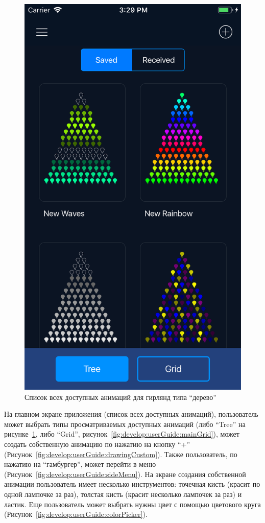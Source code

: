 \begin{figure}[H]
\centering
	\includegraphics[scale=0.2]{figures/userGuide/mainTree.png}
	\caption{Список всех доступных анимаций для гирлянд типа ``дерево''}
	\label{fig:develop:userGuide:mainTree}
\end{figure}

На главном экране приложения (список всех доступных анимаций), пользователь может выбрать типы просматриваемых доступных анимаций (либо ``Tree'' на рисунке~\ref{fig:develop:userGuide:mainTree}, либо ``Grid'', рисунок~\ref{fig:develop:userGuide:mainGrid}), может создать собственную анимацию по нажатию на кнопку ``+'' (Рисунок~\ref{fig:develop:userGuide:drawingCustom}). Также пользователь, по нажатию на ``гамбургер'', может перейти в меню (Рисунок~\ref{fig:develop:userGuide:sideMenu}). На экране создания собственной анимации пользователь имеет несколько инструментов: точечная кисть (красит по одной лампочке за раз), толстая кисть (красит несколько лампочек за раз) и ластик. Еще пользователь может выбрать нужны цвет с помощью цветового круга (Рисунок~\ref{fig:develop:userGuide:colorPicker}).

